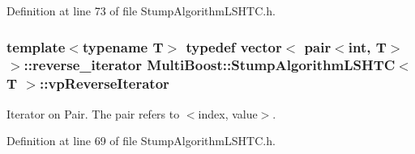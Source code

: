 Definition at line 73 of file Stump\-Algorithm\-L\-S\-H\-T\-C.\-h.

\hypertarget{classMultiBoost_1_1StumpAlgorithmLSHTC_afb453a312f66e27f2c3a87127b113e58}{
\subsubsection[{vp\-Reverse\-Iterator}]{\setlength{\rightskip}{0pt plus 5cm}template$<$typename T$>$ typedef vector$<$ pair$<$int, T$>$ $>$\-::reverse\-\_\-iterator {\bf Multi\-Boost\-::\-Stump\-Algorithm\-L\-S\-H\-T\-C}$<$ T $>$\-::{\bf vp\-Reverse\-Iterator}}}\label{classMultiBoost_1_1StumpAlgorithmLSHTC_afb453a312f66e27f2c3a87127b113e58}
Iterator on Pair. The pair refers to $<$index, value$>$. 

Definition at line 69 of file Stump\-Algorithm\-L\-S\-H\-T\-C.\-h.



